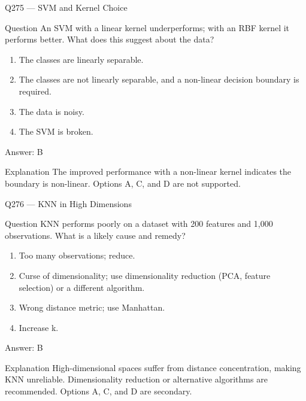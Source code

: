 \documentclass[aspectratio=169,8pt]{beamer}
\begin{document}
\begin{frame}{Q275 --- SVM and Kernel Choice}
\begin{block}{Question}
An SVM with a linear kernel underperforms; with an RBF kernel it performs better. What does this suggest about the data?
\end{block}
\begin{enumerate}
\item The classes are linearly separable.
\item The classes are not linearly separable, and a non-linear decision boundary is required.
\item The data is noisy.
\item The SVM is broken.
\end{enumerate}
\begin{exampleblock}{Answer: B}\end{exampleblock}
\begin{block}{Explanation}
The improved performance with a non-linear kernel indicates the boundary is non-linear. Options A, C, and D are not supported.
\end{block}
\end{frame}

\begin{frame}{Q276 --- KNN in High Dimensions}
\begin{block}{Question}
KNN performs poorly on a dataset with 200 features and 1,000 observations. What is a likely cause and remedy?
\begin{enumerate} 
\item Too many observations; reduce.
\item Curse of dimensionality; use dimensionality reduction (PCA, feature selection) or a different algorithm.
\item Wrong distance metric; use Manhattan.
\item Increase k.
\end{enumerate}\end{block}
\begin{exampleblock}{Answer: B}\end{exampleblock}
\begin{block}{Explanation}
High-dimensional spaces suffer from distance concentration, making KNN unreliable. Dimensionality reduction or alternative algorithms are recommended. Options A, C, and D are secondary.
\end{block}
\end{frame}
\end{document}
